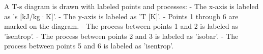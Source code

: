 A T-s diagram is drawn with labeled points and processes:  
- The x-axis is labeled as 's [kJ/kg·K]'.  
- The y-axis is labeled as 'T [K]'.  
- Points 1 through 6 are marked on the diagram.  
- The process between points 1 and 2 is labeled as 'isentrop'.  
- The process between points 2 and 3 is labeled as 'isobar'.  
- The process between points 5 and 6 is labeled as 'isentrop'.